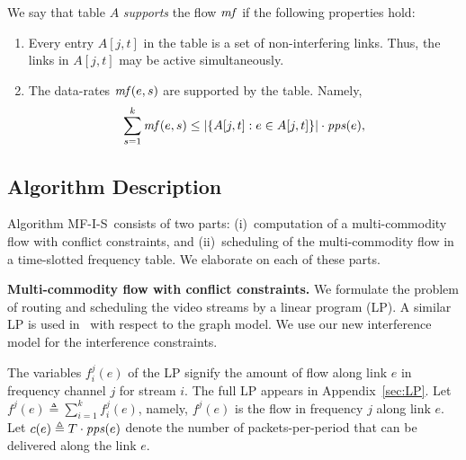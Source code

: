 \documentclass[11pt]{article}
\newenvironment{proof sketch}[1]{\noindent {\emph{Proof sketch of #1:}}}{\hfill \qed}
\newcommand{\eqdf}{\triangleq}
\newcommand{\pps}{\text{\emph{pps}}}
\newcommand{\mf}{\text{\emph{mf}}}
\newcommand{\algA}{\textsc{MF-I-S}}
\begin{document}
\medskip \noindent We say that table $A$ \emph{supports} the flow
$\mf$ if the following properties hold:
\begin{enumerate}
\item Every entry $A[j,t]$ in the table is a set of non-interfering
  links. Thus, the links in $A[j,t]$ may be active simultaneously.
\item The data-rates $\mf(e,s)$ are supported by the table. Namely,
  \begin{align}\label{eq:support}
    \sum_{s=1}^k \mf(e,s) \leq |\{A[j,t] : e\in A[j,t]\}|\cdot
    \pps(e),
  \end{align}
\end{enumerate}

\subsection{Algorithm Description} \label{sec:sched} Algorithm \algA\
consists of two parts: (i)~computation of a multi-commodity flow with
conflict constraints, and (ii)~scheduling of the multi-commodity flow
in a time-slotted frequency table.  We elaborate on each of these
parts.

\medskip
\noindent
\textbf{Multi-commodity flow with conflict constraints.}  We formulate
the problem of routing and scheduling the video streams by a linear
program (LP).  A similar LP is used
in~\cite{kumar2005algorithmic,alicherry2005joint11,buragohain2007improved}
with respect to the graph model.  We use our new interference model
for the interference constraints.

The variables $f^j_i(e)$ of the LP signify the amount of flow along
link $e$ in frequency channel $j$ for stream $i$.  The full LP appears
in Appendix~\ref{sec:LP}.  Let $f^j(e) \eqdf\sum_{i=1}^k f^j_i(e)$,
namely, $f^j(e)$ is the flow in frequency $j$ along link $e$.  Let
$c(e)\eqdf T \cdot \pps(e)$ denote the number of packets-per-period
that can be delivered along the link $e$.
\end{document}
